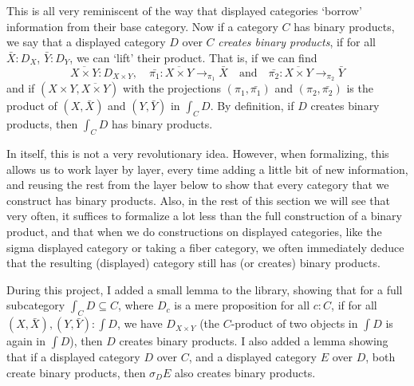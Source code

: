 This is all very reminiscent of the way that displayed categories `borrow' information from their base category. Now if a category $ C $ has binary products, we say that a displayed category $ D $ over $ C $ \textit{creates binary products}, if for all $ \bar X : D_X $, $ \bar Y : D_Y $, we can `lift' their product. That is, if we can find
\[ \overline{X \times Y} : D_{X \times Y}, \quad \bar{\pi_1} : \overline{X \times Y} \to_{\pi_1} \bar X \quad \text{and} \quad \bar{\pi_2} : \overline{X \times Y} \to_{\pi_2} \bar Y \]
and if $ (X \times Y, \overline{X \times Y}) $ with the projections $ (\pi_1, \bar{\pi_1}) $ and $ (\pi_2, \bar{\pi_2}) $ is the product of $ (X, \bar X) $ and $ (Y, \bar Y) $ in $ \int_C D $. By definition, if $ D $ creates binary products, then $ \int_C D $ has binary products.

In itself, this is not a very revolutionary idea. However, when formalizing, this allows us to work layer by layer, every time adding a little bit of new information, and reusing the rest from the layer below to show that every category that we construct has binary products. Also, in the rest of this section we will see that very often, it suffices to formalize a lot less than the full construction of a binary product, and that when we do constructions on displayed categories, like the sigma displayed category or taking a fiber category, we often immediately deduce that the resulting (displayed) category still has (or creates) binary products.

During this project, I added a small lemma to the library, showing that for a full subcategory $ \int_C D \subseteq C $, where $ D_c $ is a mere proposition for all $ c : C $, if for all $ (X, \bar X), (Y, \bar Y) : \int D $, we have $ D_{X \times Y} $ (the $ C $-product of two objects in $ \int D $ is again in $ \int D $), then $ D $ creates binary products. I also added a lemma showing that if a displayed category $ D $ over $ C $, and a displayed category $ E $ over $ D $, both create binary products, then $ \sigma_D E $ also creates binary products.

